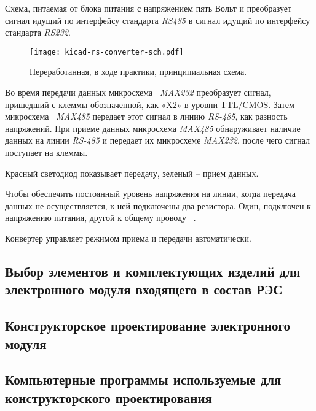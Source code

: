 Схема, питаемая от блока питания с напряжением пять Вольт
и преобразует сигнал идущий по интерфейсу
стандарта \textit{RS485} в сигнал идущий по интерфейсу
стандарта \textit{RS232}.

\begin{figure}[H]
  \centering
  \texttt{[image: kicad-rs-converter-sch.pdf]}
  \caption{Переработанная, в ходе практики, принципиальная схема.}
\end{figure}


Во время передачи данных микросхема ~\textit{MAX232} преобразует сигнал,
пришедший с клеммы обозначенной,
как «X2» в уровни TTL/CMOS.
Затем микросхема ~\textit{MAX485}
передает этот сигнал в линию \textit{RS-485}, как разность напряжений.
При приеме данных микросхема \textit{MAX485} обнаруживает наличие данных
на линии \textit{RS-485} и передает их микросхеме \textit{MAX232},
после чего сигнал поступает на клеммы.

Красный светодиод показывает передачу,
зеленый – прием данных.

Чтобы обеспечить постоянный уровень напряжения на линии,
когда передача данных не осуществляется,
к ней подключены два резистора.
Один, подключен к напряжению питания, другой к общему проводу ~\cite{rlocman-rs-converter}.

Конвертер управляет режимом приема и передачи автоматически.

\subsection{Выбор элементов и комплектующих изделий для электронного модуля входящего в состав РЭС}

\subsection{Конструкторское проектирование электронного модуля}

\subsection{Компьютерные программы используемые для конструкторского проектирования}

\newpage

